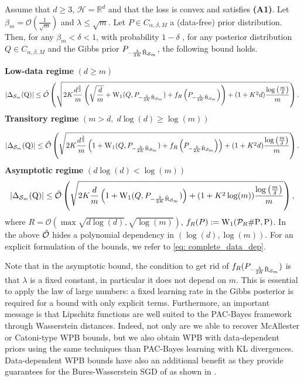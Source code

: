 \begin{theorem}
\label{th: data_dep}
Assume that $d\geq 3$, $\mathcal{H}= \mathbb{R}^d$ and that the loss is convex and satisfies \textbf{(A1)}. Let $\beta_m= \mathcal{O}(\frac{1}{\sqrt{m}})$ and $\lambda \leq \sqrt{m}$.
Let $P\in C_{\alpha,\beta,M}$ a (data-free) prior distribution. Then, for any $\beta_m<\delta<1$, with probability $1-\delta$ , for any posterior distribution $Q\in C_{\alpha,\beta,M}$ and the Gibbs prior $P_{-\frac{\lambda}{2K} \hat{\text{R}}_{\mathcal{S}_m}}$, the following bound holds.

\noindent\textbf{Low-data regime} $(d\geq m)$
\begin{align*}
|\Delta_{\mathcal{S}_m}(\mathrm{Q})|  \leq\Tilde{\mathcal{O}}\left( \sqrt{2K\frac{d^{\frac{3}{2}}}{m}\left(\sqrt{\frac{d}{m}}+  \mathrm{W}_{1}(Q,P_{-\frac{\lambda}{2K}\hat{\text{R}}_{\mathcal{S}_m}}) +f_R\left(P_{-\frac{\lambda}{2K}\hat{\text{R}}_{\mathcal{S}_m}}\right)\right)+(1+K^2d)\frac{\log\left( \frac{m}{\delta} \right)}{m}}   \right).
\end{align*}
\textbf{Transitory regime} $(m>d,\; d\log(d)\geq \log(m))$

\begin{align*}
|\Delta_{\mathcal{S}_m}(\mathrm{Q})|  \leq\Tilde{\mathcal{O}}\left( \sqrt{2K\frac{d^{\frac{3}{2}}}{m}\left(1+ \mathrm{W}_{1}(Q,P_{-\frac{\lambda}{2K}\hat{\text{R}}_{\mathcal{S}_m}})+ f_R\left(P_{-\frac{\lambda}{2K}\hat{\text{R}}_{\mathcal{S}_m}}\right)\right)+(1+K^2d)\frac{\log\left( \frac{m}{\delta} \right)}{m}}   \right).
\end{align*}
\textbf{Asymptotic regime} $(d\log(d)< \log(m))$
\begin{align*}
|\Delta_{\mathcal{S}_m}(\mathrm{Q})|  \leq\Tilde{\mathcal{O}}\left( \sqrt{2K\frac{d}{m}\left(1 + \mathrm{W}_{1}(Q,P_{-\frac{\lambda}{2K}\hat{\text{R}}_{\mathcal{S}_m}})\right)+(1+K^2\log(m))\frac{\log\left( \frac{m}{\delta} \right)}{m}}   \right),
\end{align*}
where $R= \mathcal{O}\left( \max \sqrt{d\log(d)}, \sqrt{\log(m)}   \right)$, $f_R(P) := \mathrm{W}_{1}(\mathcal{P}_{R}\#\mathrm{P},\mathrm{P})$.
In the above $\Tilde{\mathcal{O}}$ hides a polynomial dependency in $(\log(d),\log(m))$. For an explicit formulation of the bounds, we refer to \eqref{eq: complete_data_dep}.
\end{theorem}
Note that in the asymptotic bound, the condition to get rid of $f_R(P_{-\frac{\lambda}{2K}\hat{\text{R}}_{\mathcal{S}_m}})$ is that $\lambda$ is a fixed constant, in particular it does not depend on $m$. This is essential to apply the law of large numbers: a fixed learning rate in the Gibbs posterior is required for a bound with only explicit terms.
Furthermore, an important message is that Lipschitz functions are well suited to the PAC-Bayes framework through Wasserstein distances. Indeed, not only are we able to recover McAllester or Catoni-type WPB bounds, but we also obtain WPB with data-dependent priors using the same techniques than PAC-Bayes learning with KL divergences. Data-dependent WPB bounds have also an additional benefit as they provide guarantees for the Bures-Wasserstein SGD of \citet{lambert2022variational} as shown in .

